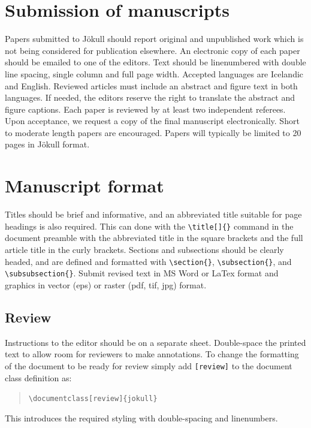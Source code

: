 \documentclass{jokull}
\begin{document}
\section{Submission of manuscripts}

Papers submitted to Jökull should report original and unpublished work which is not being considered for publication elsewhere. An electronic copy of each paper should be emailed to one of the editors. Text should be linenumbered with double line spacing, single column and full page width. Accepted languages are Icelandic and English. Reviewed articles must include an abstract and figure text in both languages. If needed, the editors reserve the right to translate the abstract and figure captions. Each paper is reviewed by at least two independent referees. Upon acceptance, we request a copy of the final manuscript electronically. Short to moderate length papers are encouraged. Papers will typically be limited to 20 pages in Jökull format.



\section{Manuscript format}

Titles should be brief and informative, and an abbreviated title suitable for page headings is also required. This can done with the \verb"\title[]{}" command in the document preamble with the abbreviated title in the square brackets and the full article title in the curly brackets. Sections and subsections should be clearly headed, and are defined and formatted with \verb"\section{}", \verb"\subsection{}", and \verb"\subsubsection{}". Submit revised text in MS Word or LaTex format and graphics in vector (eps) or raster (pdf, tif, jpg) format.

\subsection{Review}

Instructions to the editor should be on a separate sheet. Double-space the printed text to allow room for reviewers to make annotations. To change the formatting of the document to be ready for review simply add \verb"[review]" to the document class definition as: 
\begin{quote}
    \verb"\documentclass[review]{jokull}"
\end{quote}
This introduces the required styling with double-spacing and linenumbers.
\end{document}
